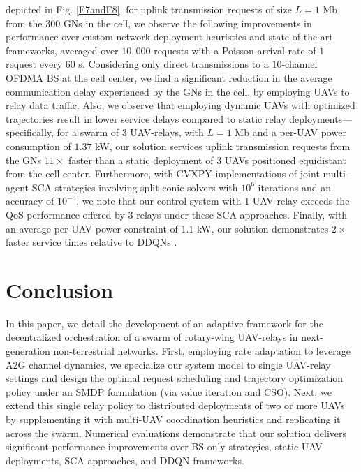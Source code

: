 \documentclass[10pt,twocolumn]{IEEEtran}
\begin{document}
 depicted in Fig. \ref{F7andF8}, for uplink transmission requests of size $L{=}1$ Mb from the $300$ GNs in the cell, we observe the following improvements in performance over custom network deployment heuristics and state-of-the-art frameworks, averaged over $10,000$ requests with a Poisson arrival rate of $1$ request every $60$ s. Considering only direct transmissions to a $10$-channel OFDMA BS at the cell center, we find a significant reduction in the average communication delay experienced by the GNs in the cell, by employing UAVs to relay data traffic. Also, we observe that employing dynamic UAVs with optimized trajectories result in lower service delays compared to static relay deployments---specifically, for a swarm of $3$ UAV-relays, with $L{=}1$ Mb and a per-UAV power consumption of $1.37$ kW, our solution services uplink transmission requests from the GNs $11{\times}$ faster than a static deployment of $3$ UAVs positioned equidistant from the cell center. Furthermore, with CVXPY implementations of joint multi-agent SCA strategies \cite{SCA, CSCA-ADMM} involving split conic solvers with $10^{6}$ iterations and an accuracy of $10^{-6}$, we note that our control system with $1$ UAV-relay exceeds the QoS performance offered by $3$ relays under these SCA approaches. Finally, with an average per-UAV power constraint of $1.1$ kW, our solution demonstrates $2{\times}$ faster service times relative to DDQNs \cite{DDQN}.

\vspace{-4mm}
\section{Conclusion}\label{VI}
In this paper, we detail the development of an adaptive framework for the decentralized orchestration of a swarm of rotary-wing UAV-relays in next-generation non-terrestrial networks. First, employing rate adaptation to leverage A2G channel dynamics, we specialize our system model to single UAV-relay settings and design the optimal request scheduling and trajectory optimization policy under an SMDP formulation (via value iteration and CSO). Next, we extend this single relay policy to distributed deployments of two or more UAVs by supplementing it with multi-UAV coordination heuristics and replicating it across the swarm. Numerical evaluations demonstrate that our solution delivers significant performance improvements over BS-only strategies, static UAV deployments, SCA approaches, and DDQN frameworks.

\vspace{-4mm}


\end{document}
